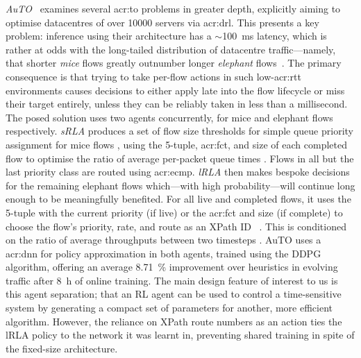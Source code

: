 \emph{AuTO}~\parencite{DBLP:conf/sigcomm/ChenL0L18} examines several \gls{acr:to} problems in greater depth, explicitly aiming to optimise datacentres of over \num{10000} servers via \gls{acr:drl}.
This presents a key problem: inference using their architecture has a $\sim$\qty{100}{\milli\second} latency, which is rather at odds with the long-tailed distribution of datacentre traffic---namely, that shorter \emph{mice} flows greatly outnumber longer \emph{elephant} flows~\parencite{DBLP:journals/ccr/PanBPS03}.
The primary consequence is that trying to take per-flow actions in such low-\gls{acr:rtt} environments causes decisions to either apply late into the flow lifecycle or miss their target entirely, unless they can be reliably taken in less than a millisecond.
The posed solution uses two agents concurrently, for mice and elephant flows respectively.
\emph{sRLA} produces a set of flow size thresholds for simple queue priority assignment for mice flows \prllitactreal, using the 5-tuple, \gls{acr:fct}, and size of each completed flow \prllitstate{} to optimise the ratio of average per-packet queue times \prllitreward.
Flows in all but the last priority class are routed using \gls{acr:ecmp}.
\emph{lRLA} then makes bespoke decisions for the remaining elephant flows which---with high probability---will continue long enough to be meaningfully benefited.
For all live and completed flows, it uses the 5-tuple with the current priority (if live) or the \gls{acr:fct} and size (if complete) \prllitstate{} to choose the flow's priority, rate, and route as an XPath ID~\parencite{DBLP:journals/ton/Hu0W0L0ZG16} \parenglance{$\rllitactraw\times\rllitactrealraw$}.
This is conditioned on the ratio of average throughputs between two timesteps \prllitreward.
AuTO uses a \gls{acr:dnn} for policy approximation in both agents, trained using the DDPG algorithm, offering an average \qty{8.71}{\percent} improvement over heuristics in evolving traffic after \qty{8}{\hour} of online training.
The main design feature of interest to us is this agent separation; that an RL agent can be used to control a time-sensitive system by generating a compact set of parameters for another, more efficient algorithm.
However, the reliance on XPath route numbers as an action ties the lRLA policy to the network it was learnt in, preventing shared training in spite of the fixed-size architecture.

